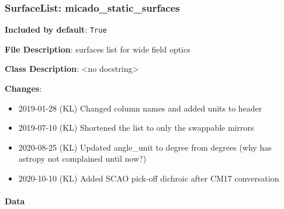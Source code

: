 \subsubsection{SurfaceList: \textquotedbl{}micado\_static\_surfaces\textquotedbl{}%
  \label{surfacelist-micado-static-surfaces}%
}

\textbf{Included by default}: \texttt{True}

\textbf{File Description}: surfaces list for wide field optics

\textbf{Class Description}: <no docstring>

\textbf{Changes}:

\begin{itemize}
\item 2019-01-28 (KL) Changed column names and added units to header

\item 2019-07-10 (KL) Shortened the list to only the swappable mirrors

\item 2020-08-25 (KL) Updated angle\_unit to degree from degrees (why has astropy not complained until now?)

\item 2020-10-10 (KL) Added SCAO pick-off dichroic after CM17 conversation
\end{itemize}


\paragraph{Data%
  \label{data}%
}

\begin{figure}[H]
\noindent{}\label{fig-micado-static-surfaces}
\end{figure}

